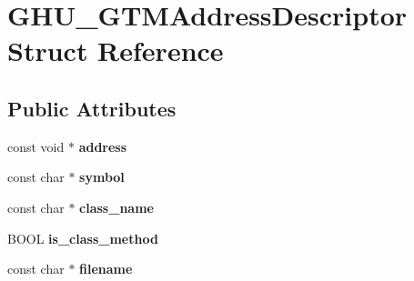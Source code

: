 \hypertarget{struct_g_h_u___g_t_m_address_descriptor}{
\section{\-G\-H\-U\-\_\-\-G\-T\-M\-Address\-Descriptor \-Struct \-Reference}
\label{struct_g_h_u___g_t_m_address_descriptor}
}
\subsection*{\-Public \-Attributes}
\begin{DoxyCompactItemize}
\item 
\hypertarget{struct_g_h_u___g_t_m_address_descriptor_a88363b8978b0639062d89f94ed6e7c50}{
const void $\ast$ {\bfseries address}}
\label{struct_g_h_u___g_t_m_address_descriptor_a88363b8978b0639062d89f94ed6e7c50}

\item 
\hypertarget{struct_g_h_u___g_t_m_address_descriptor_a26b88d837b09b621b83eac0ee139f233}{
const char $\ast$ {\bfseries symbol}}
\label{struct_g_h_u___g_t_m_address_descriptor_a26b88d837b09b621b83eac0ee139f233}

\item 
\hypertarget{struct_g_h_u___g_t_m_address_descriptor_af2a061518521acd9bc06c5bdd27571f7}{
const char $\ast$ {\bfseries class\-\_\-name}}
\label{struct_g_h_u___g_t_m_address_descriptor_af2a061518521acd9bc06c5bdd27571f7}

\item 
\hypertarget{struct_g_h_u___g_t_m_address_descriptor_a54c41a66dfd43abc456dd59a8fc1a485}{
\-B\-O\-O\-L {\bfseries is\-\_\-class\-\_\-method}}
\label{struct_g_h_u___g_t_m_address_descriptor_a54c41a66dfd43abc456dd59a8fc1a485}

\item 
\hypertarget{struct_g_h_u___g_t_m_address_descriptor_ad23dec5cae7294d154428d9cc99bcdf6}{
const char $\ast$ {\bfseries filename}}
\label{struct_g_h_u___g_t_m_address_descriptor_ad23dec5cae7294d154428d9cc99bcdf6}

\end{DoxyCompactItemize}


